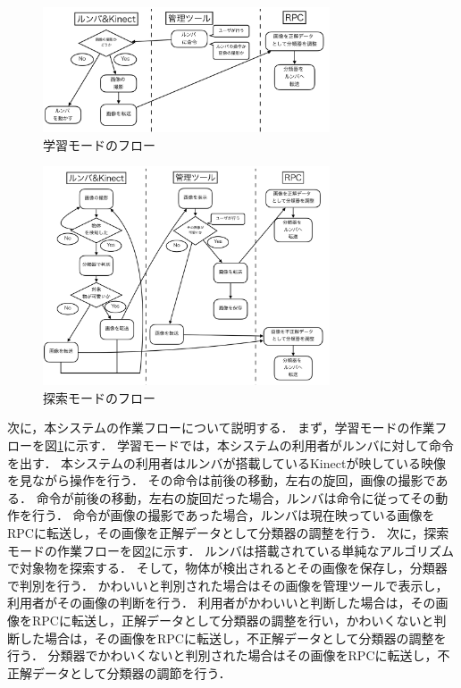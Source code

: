 \documentclass[a4paper, twocolumn]{jarticle}
\begin{document}
\begin{figure}[t]
	\includegraphics[width=8.5cm]{fig/flow_study.png}
	\caption{学習モードのフロー}
	\label{fig:learn_flow}
\end{figure}

\begin{figure}[t]
	\includegraphics[width=8.5cm]{fig/flow_search.png}
	\caption{探索モードのフロー}
	\label{fig:search_flow}
\end{figure}

次に，本システムの作業フローについて説明する．
まず，学習モードの作業フローを図\ref{fig:learn_flow}に示す．
学習モードでは，本システムの利用者がルンバに対して命令を出す．
本システムの利用者はルンバが搭載しているKinectが映している映像を見ながら操作を行う．
その命令は前後の移動，左右の旋回，画像の撮影である．
命令が前後の移動，左右の旋回だった場合，ルンバは命令に従ってその動作を行う．
命令が画像の撮影であった場合，ルンバは現在映っている画像をRPCに転送し，その画像を正解データとして分類器の調整を行う．
次に，探索モードの作業フローを図\ref{fig:search_flow}に示す．
ルンバは搭載されている単純なアルゴリズムで対象物を探索する．
そして，物体が検出されるとその画像を保存し，分類器で判別を行う．
かわいいと判別された場合はその画像を管理ツールで表示し，利用者がその画像の判断を行う．
利用者がかわいいと判断した場合は，その画像をRPCに転送し，正解データとして分類器の調整を行い，かわいくないと判断した場合は，その画像をRPCに転送し，不正解データとして分類器の調整を行う．
分類器でかわいくないと判別された場合はその画像をRPCに転送し，不正解データとして分類器の調節を行う．
\end{document}
